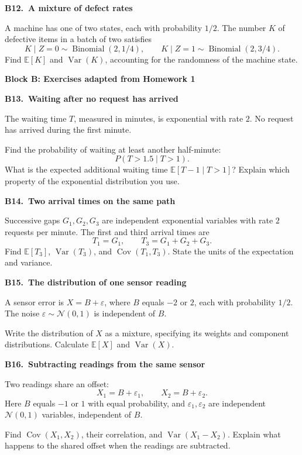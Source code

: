\documentclass[11pt,a4paper]{article}
\newcommand{\blocktitle}[2]{{\Large\sffamily\bfseries\color{Ink}Block #1: #2}\par\vspace{5pt}}
\newenvironment{question}[2]{\par\addvspace{10pt}\begin{minipage}{\linewidth}{\sffamily\bfseries\color{Ink}#1.\ #2}\par\vspace{3pt}}{\end{minipage}\par}
\newcommand{\E}{\mathbb E}
\newcommand{\Var}{\operatorname{Var}}
\newcommand{\Cov}{\operatorname{Cov}}
\begin{document}
\begin{question}{B12}{A mixture of defect rates}
A machine has one of two states, each with probability $1/2$. The number
$K$ of defective items in a batch of two satisfies
\[
K\mid Z=0\sim\operatorname{Binomial}(2,1/4),\qquad
K\mid Z=1\sim\operatorname{Binomial}(2,3/4).
\]
Find $\E[K]$ and $\Var(K)$, accounting for the randomness of the machine state.
\end{question}

\newpage
\blocktitle{B}{Exercises adapted from Homework 1}
\begin{question}{B13}{Waiting after no request has arrived}
The waiting time $T$, measured in minutes, is exponential with rate $2$.
No request has arrived during the first minute.

Find the probability of waiting at least another half-minute:
\[
P(T>1.5\mid T>1).
\]
What is the expected additional waiting time $\E[T-1\mid T>1]$?
Explain which property of the exponential distribution you use.
\end{question}

\begin{question}{B14}{Two arrival times on the same path}
Successive gaps $G_1,G_2,G_3$ are independent exponential variables with
rate $2$ requests per minute. The first and third arrival times are
\[
T_1=G_1,\qquad T_3=G_1+G_2+G_3.
\]
Find $\E[T_3]$, $\Var(T_3)$, and $\Cov(T_1,T_3)$.
State the units of the expectation and variance.
\end{question}

\begin{question}{B15}{The distribution of one sensor reading}
A sensor error is $X=B+\varepsilon$, where $B$ equals $-2$ or $2$, each
with probability $1/2$. The noise $\varepsilon\sim\mathcal N(0,1)$ is
independent of $B$.

Write the distribution of $X$ as a mixture, specifying its weights and
component distributions. Calculate $\E[X]$ and $\Var(X)$.
\end{question}

\begin{question}{B16}{Subtracting readings from the same sensor}
Two readings share an offset:
\[
X_1=B+\varepsilon_1,\qquad X_2=B+\varepsilon_2.
\]
Here $B$ equals $-1$ or $1$ with equal probability, and
$\varepsilon_1,\varepsilon_2$ are independent $\mathcal N(0,1)$ variables,
independent of $B$.

Find $\Cov(X_1,X_2)$, their correlation, and $\Var(X_1-X_2)$.
Explain what happens to the shared offset when the readings are subtracted.
\end{question}
\end{document}

